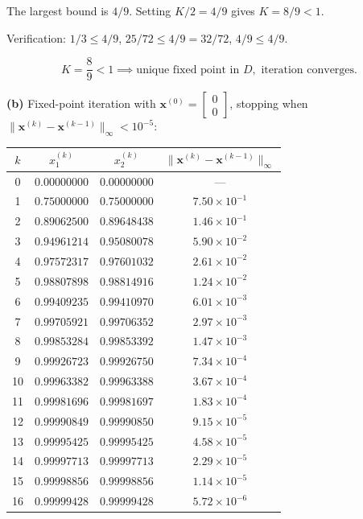 \documentclass[12pt,letterpaper]{article}
\begin{document}
The largest bound is $4/9$. Setting $K/2 = 4/9$ gives $K = 8/9 < 1$.

Verification: $1/3 \le 4/9$, \; $25/72 \le 4/9 = 32/72$, \; $4/9 \le 4/9$.

\[
\boxed{K = \frac{8}{9} < 1 \implies \text{unique fixed point in } D, \text{ iteration converges.}}
\]


\textbf{(b)} Fixed-point iteration with $\mathbf{x}^{(0)} = \begin{bmatrix} 0 \\ 0 \end{bmatrix}$, stopping when $\|\mathbf{x}^{(k)} - \mathbf{x}^{(k-1)}\|_\infty < 10^{-5}$:

\begin{center}
\begin{tabular}{cccc}
\toprule
$k$ & $x_1^{(k)}$ & $x_2^{(k)}$ & $\|\mathbf{x}^{(k)} - \mathbf{x}^{(k-1)}\|_\infty$ \\
\midrule
0 & $0.00000000$ & $0.00000000$ & --- \\
1 & $0.75000000$ & $0.75000000$ & $7.50 \times 10^{-1}$ \\
2 & $0.89062500$ & $0.89648438$ & $1.46 \times 10^{-1}$ \\
3 & $0.94961214$ & $0.95080078$ & $5.90 \times 10^{-2}$ \\
4 & $0.97572317$ & $0.97601032$ & $2.61 \times 10^{-2}$ \\
5 & $0.98807898$ & $0.98814916$ & $1.24 \times 10^{-2}$ \\
6 & $0.99409235$ & $0.99410970$ & $6.01 \times 10^{-3}$ \\
7 & $0.99705921$ & $0.99706352$ & $2.97 \times 10^{-3}$ \\
8 & $0.99853284$ & $0.99853392$ & $1.47 \times 10^{-3}$ \\
9 & $0.99926723$ & $0.99926750$ & $7.34 \times 10^{-4}$ \\
10 & $0.99963382$ & $0.99963388$ & $3.67 \times 10^{-4}$ \\
11 & $0.99981696$ & $0.99981697$ & $1.83 \times 10^{-4}$ \\
12 & $0.99990849$ & $0.99990850$ & $9.15 \times 10^{-5}$ \\
13 & $0.99995425$ & $0.99995425$ & $4.58 \times 10^{-5}$ \\
14 & $0.99997713$ & $0.99997713$ & $2.29 \times 10^{-5}$ \\
15 & $0.99998856$ & $0.99998856$ & $1.14 \times 10^{-5}$ \\
16 & $0.99999428$ & $0.99999428$ & $5.72 \times 10^{-6}$ \\
\bottomrule
\end{tabular}
\end{center}
\end{document}
